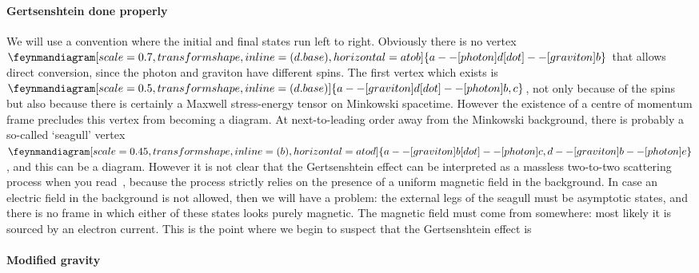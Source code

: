 \documentclass[aps,prd,reprint,preprintnumbers,showpacs,floatfix,nofootinbib,superscript address,longbibliography]{revtex4-2}
\begin{document}
\paragraph*{Gertsenshtein done properly} We will use a convention where the initial and final states run left to right. Obviously there is no vertex $\feynmandiagram[scale=0.7,transform shape, inline=(d.base), horizontal=a to b]{a -- [photon] d [dot] -- [graviton] b}$ that allows direct conversion, since the photon and graviton have different spins. The first vertex which exists is $\feynmandiagram[scale=0.5,transform shape, inline=(d.base)]{a -- [graviton] d [dot] -- [photon] {b,c}}$, not only because of the spins but also because there is certainly a Maxwell stress-energy tensor on Minkowski spacetime. However the existence of a centre of momentum frame precludes this vertex from becoming a diagram. At next-to-leading order away from the Minkowski background, there is probably a so-called `seagull' vertex $\feynmandiagram[scale=0.45,transform shape, inline=(b), horizontal=a to d]{a -- [graviton] b [dot] -- [photon] c,d -- [graviton] b -- [photon] e}$, and this can be a diagram. However it is not clear that the Gertsenshtein effect can be interpreted as a massless two-to-two scattering process when you read~\cite{Palessandro:2023tee}, because the process strictly relies on the presence of a uniform magnetic field in the background. In case an electric field in the background is not allowed, then we will have a problem: the external legs of the seagull must be asymptotic states, and there is no frame in which either of these states looks purely magnetic. The magnetic field must come from somewhere: most likely it is sourced by an electron current. This is the point where we begin to suspect that the Gertsenshtein effect is 
\paragraph*{Modified gravity}
	
%

\end{document}

